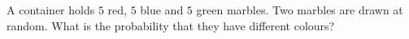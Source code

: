 A container holds $5$ red, $5$ blue and $5$ green marbles. Two marbles are drawn at random. What is the probability that they have different colours?
